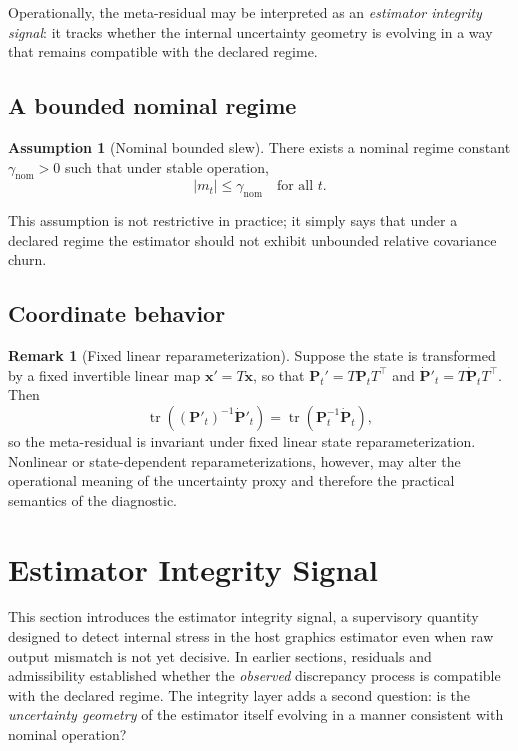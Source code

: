 \documentclass[11pt]{article}
\newcommand{\state}{\mathbf{x}}
\newcommand{\covar}{\mathbf{P}}
\newcommand{\metares}{m}
\newcommand{\trace}{\operatorname{tr}}
\newcommand{\abs}[1]{\left\lvert #1 \right\rvert}
\theoremstyle{definition}
\newtheorem{assumption}[definition]{Assumption}
\newtheorem{remark}[definition]{Remark}
\theoremstyle{plain}
\begin{document}
Operationally, the meta-residual may be interpreted as an \emph{estimator integrity signal}: it tracks whether the internal uncertainty geometry is evolving in a way that remains compatible with the declared regime.

\subsection{A bounded nominal regime}
\begin{assumption}[Nominal bounded slew]
There exists a nominal regime constant $\gamma_{\mathrm{nom}} > 0$ such that under stable operation,
\begin{equation}
    \abs{\metares_t} \le \gamma_{\mathrm{nom}} \quad \text{for all } t.
\end{equation}
\end{assumption}

This assumption is not restrictive in practice; it simply says that under a declared regime the estimator should not exhibit unbounded relative covariance churn.

\subsection{Coordinate behavior}
\begin{remark}[Fixed linear reparameterization]
Suppose the state is transformed by a fixed invertible linear map $\state' = T\state$, so that $\covar_t' = T\covar_t T^\top$ and $\dot{\covar}'_t = T\dot{\covar}_t T^\top$. Then
\begin{equation}
    \trace\!\left((\covar'_t)^{-1}\dot{\covar}'_t\right) = \trace(\covar_t^{-1}\dot{\covar}_t),
\end{equation}
so the meta-residual is invariant under fixed linear state reparameterization. Nonlinear or state-dependent reparameterizations, however, may alter the operational meaning of the uncertainty proxy and therefore the practical semantics of the diagnostic.
\end{remark}


\section{Estimator Integrity Signal}
\label{sec:eis}

This section introduces the estimator integrity signal, a supervisory quantity designed to detect internal stress in the host graphics estimator even when raw output mismatch is not yet decisive. In earlier sections, residuals and admissibility established whether the \emph{observed} discrepancy process is compatible with the declared regime. The integrity layer adds a second question: is the \emph{uncertainty geometry} of the estimator itself evolving in a manner consistent with nominal operation?
\end{document}
